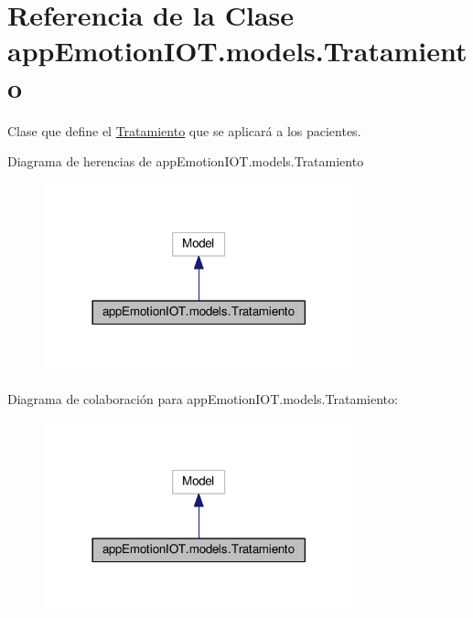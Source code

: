 \hypertarget{classappEmotionIOT_1_1models_1_1Tratamiento}{}\section{Referencia de la Clase app\+Emotion\+I\+O\+T.\+models.\+Tratamiento}
\label{classappEmotionIOT_1_1models_1_1Tratamiento}


Clase que define el \hyperlink{classappEmotionIOT_1_1models_1_1Tratamiento}{Tratamiento} que se aplicará a los pacientes.  




Diagrama de herencias de app\+Emotion\+I\+O\+T.\+models.\+Tratamiento
\nopagebreak
\begin{figure}[H]
\begin{center}
\leavevmode
\includegraphics[width=254pt]{classappEmotionIOT_1_1models_1_1Tratamiento__inherit__graph}
\end{center}
\end{figure}


Diagrama de colaboración para app\+Emotion\+I\+O\+T.\+models.\+Tratamiento\+:
\nopagebreak
\begin{figure}[H]
\begin{center}
\leavevmode
\includegraphics[width=254pt]{classappEmotionIOT_1_1models_1_1Tratamiento__coll__graph}
\end{center}
\end{figure}
